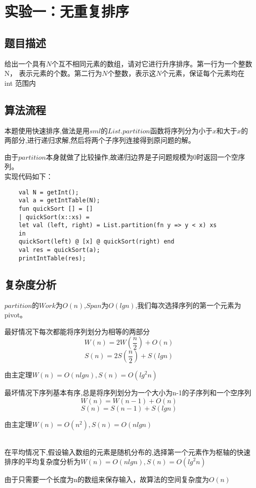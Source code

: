 \documentclass[UTF8,a4paperdui, %
]{ctexart}
\begin{document}
\newpage
\newcommand*{\calF}{\mathcal{F}}
\newcommand*{\calH}{\mathcal{H}}
\newcommand*{\vx}{\bm x}
\newcommand*{\vy}{\bm y}
\newcommand*{\vh}{\bm h}
\newcommand{\Figure}[2]{
\begin{figure}[htbp]
\centering
\texttt{[image: \#2]}
\end{figure}
}

\setcounter{tocdepth}{1}
\tableofcontents

\newpage
\section{实验一：无重复排序}

\subsection{题目描述}
给出一个具有$ N $个互不相同元素的数组，请对它进行升序排序。第一行为一个整数 N，
表示元素的个数。第二行为$ N $个整数，表示这$ N $个元素，保证每个元素均在 int 范围内

\subsection{算法流程}
本题使用快速排序,做法是用$sml$的$List.partition$函数将序列分为小于$x$和大于$x$的两部分,进行递归求解,然后将两个子序列连接得到原问题的解。
\par 由于$partition$本身就做了比较操作,故递归边界是子问题规模为0时返回一个空序列。\\
实现代码如下：
\begin{lstlisting}
    val N = getInt();
    val a = getIntTable(N);
    fun quickSort [] = []
    | quickSort(x::xs) =
    let val (left, right) = List.partition(fn y => y < x) xs
    in
    quickSort(left) @ [x] @ quickSort(right) end
    val res = quickSort(a);
    printIntTable(res);
\end{lstlisting}

\subsection{复杂度分析}
$partition$的$Work$为$O(n)$,$Span$为$O(lgn)$,我们每次选择序列的第一个元素为pivot。
\par 最好情况下每次都能将序列划分为相等的两部分
$$W(n)=2W(\frac{n}{2})+O(n)$$
$$S(n)=2S(\frac{n}{2})+S(lgn)$$
\par 由主定理$W(n)=O(nlgn),S(n)=O({lg}^2n)$

\par 最坏情况下序列基本有序,总是将序列划分为一个大小为n-1的子序列和一个空序列
$$W(n)=W(n-1)+O(n)$$
$$S(n)=S(n-1)+S(lgn)$$
\par 由主定理$W(n)=O(n^2),S(n)=O(nlgn)$
\\\
\par  在平均情况下,假设输入数组的元素是随机分布的,选择第一个元素作为枢轴的快速排序的平均复杂度分析为$W(n)=O(nlgn),S(n)=O({lg}^2n)$\par
由于只需要一个长度为n的数组来保存输入，故算法的空间复杂度为$O(n)$
\end{document}

